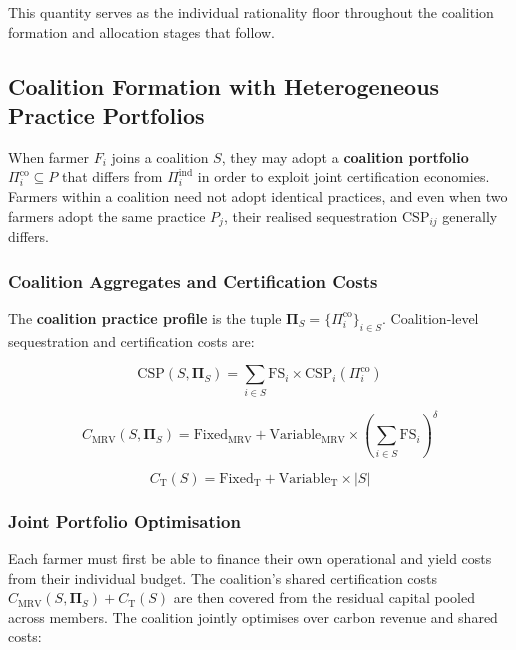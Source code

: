 \documentclass[manuscript, screen, review, anonymous]{acmart}
\begin{document}
\noindent This quantity serves as the individual rationality floor throughout
the coalition formation and allocation stages that follow.

\subsection{Coalition Formation with Heterogeneous Practice Portfolios}

When farmer $F_i$ joins a coalition $S$, they may adopt a
\textbf{coalition portfolio} $\Pi_i^{\text{co}} \subseteq P$ that differs from
$\Pi_i^{\text{ind}}$ in order to exploit joint certification economies.
Farmers within a coalition need not adopt identical practices, and even when
two farmers adopt the same practice $P_j$, their realised sequestration
$\text{CSP}_{ij}$ generally differs.

\subsubsection*{Coalition Aggregates and Certification Costs}

The \textbf{coalition practice profile} is the tuple
$\boldsymbol{\Pi}_S = \{\Pi_i^{\text{co}}\}_{i \in S}$. Coalition-level
sequestration and certification costs are:

\begin{equation}
    \text{CSP}(S, \boldsymbol{\Pi}_S) = \sum_{i \in S} \text{FS}_i \times \text{CSP}_i(\Pi_i^{\text{co}})
\end{equation}

\begin{equation}
    C_{\text{MRV}}(S, \boldsymbol{\Pi}_S) = \text{Fixed}_{\text{MRV}}
    + \text{Variable}_{\text{MRV}} \times \left(\sum_{i \in S} \text{FS}_i\right)^{\!\delta}
\end{equation}

\begin{equation}
    C_{\text{T}}(S) = \text{Fixed}_{\text{T}} + \text{Variable}_{\text{T}} \times |S|
\end{equation}

\subsubsection*{Joint Portfolio Optimisation}

Each farmer must first be able to finance their own operational and yield costs
from their individual budget. The coalition's shared certification costs
$C_{\text{MRV}}(S, \boldsymbol{\Pi}_S) + C_{\text{T}}(S)$ are then covered
from the residual capital pooled across members. The coalition jointly
optimises over carbon revenue and shared costs:
\end{document}
